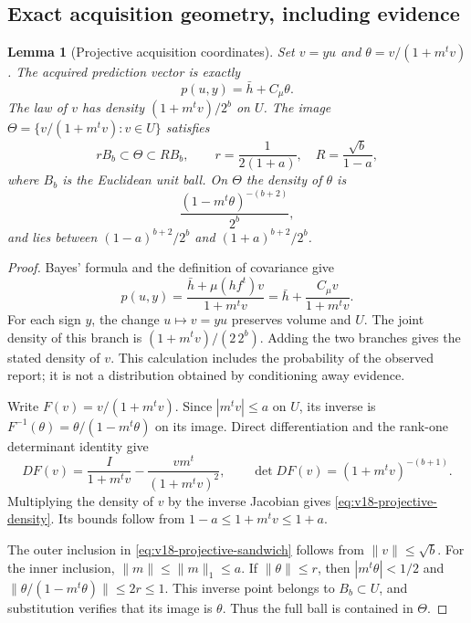 \documentclass[11pt]{amsart}
\newtheorem{lemma}[theorem]{Lemma}
\theoremstyle{definition}\newtheorem{definition}[theorem]{Definition}
\theoremstyle{remark}\newtheorem{remark}[theorem]{Remark}
\begin{document}
\subsection{Exact acquisition geometry, including evidence}
\begin{lemma}[Projective acquisition coordinates]\label{lem:v18-projective-law}
Set $v=yu$ and $\theta=v/(1+m^tv)$. The acquired prediction vector is
exactly
\begin{equation}\label{eq:v18-projective-prediction}
 p(u,y)=\bar h+C_\mu\theta.
\end{equation}
The law of $v$ has density $(1+m^tv)/2^b$ on $U$. The image
$\Theta=\{v/(1+m^tv):v\in U\}$ satisfies
\begin{equation}\label{eq:v18-projective-sandwich}
 rB_b\subset\Theta\subset RB_b,
 \qquad r=\frac1{2(1+a)},\quad R=\frac{\sqrt b}{1-a},
\end{equation}
where $B_b$ is the Euclidean unit ball. On $\Theta$ the density of
$\theta$ is
\begin{equation}\label{eq:v18-projective-density}
 \frac{(1-m^t\theta)^{-(b+2)}}{2^b},
\end{equation}
and lies between $(1-a)^{b+2}/2^b$ and $(1+a)^{b+2}/2^b$.
\end{lemma}
\begin{proof}
Bayes' formula and the definition of covariance give
\[
 p(u,y)=\frac{\bar h+\mu(hf^t)v}{1+m^tv}
       =\bar h+\frac{C_\mu v}{1+m^tv}.
\]
For each sign $y$, the change $u\mapsto v=yu$ preserves volume and
$U$. The joint density of this branch is
$(1+m^tv)/(2\,2^b)$. Adding the two branches gives the stated density
of $v$. This calculation includes the probability of the observed
report; it is not a distribution obtained by conditioning away evidence.

Write $F(v)=v/(1+m^tv)$. Since $|m^tv|\le a$ on $U$, its inverse is
$F^{-1}(\theta)=\theta/(1-m^t\theta)$ on its image. Direct
differentiation and the rank-one determinant identity give
\[
 DF(v)=\frac{I}{1+m^tv}-\frac{vm^t}{(1+m^tv)^2},\qquad
 \det DF(v)=(1+m^tv)^{-(b+1)}.
\]
Multiplying the density of $v$ by the inverse Jacobian gives
\eqref{eq:v18-projective-density}. Its bounds follow from
$1-a\le1+m^tv\le1+a$.

The outer inclusion in \eqref{eq:v18-projective-sandwich} follows from
$\|v\|\le\sqrt b$. For the inner inclusion, $\|m\|\le\|m\|_1\le a$.
If $\|\theta\|\le r$, then $|m^t\theta|<1/2$ and
$\|\theta/(1-m^t\theta)\|\le2r\le1$. This inverse point belongs
to $B_b\subset U$, and substitution verifies that its image is
$\theta$. Thus the full ball is contained in $\Theta$.
\end{proof}
\end{document}
